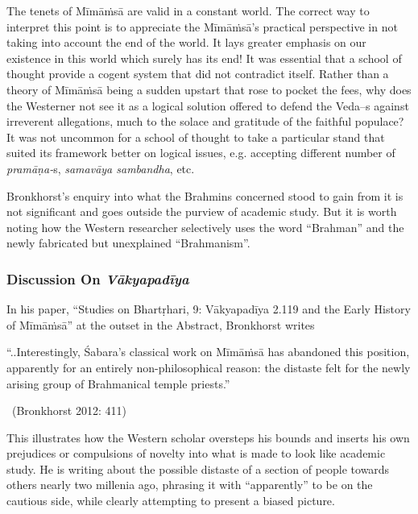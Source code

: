 The tenets of Mīmāṁsā are valid in a constant world. The correct way to interpret this point is to appreciate the Mīmāṁsā’s practical perspective in not taking into account the end of the world. It lays greater emphasis on our existence in this world which surely has its end! It was essential that a school of thought provide a cogent system that did not contradict itself. Rather than a theory of Mīmāṁsā being a sudden upstart that rose to pocket the fees, why does the Westerner not see it as a logical solution offered to defend the Veda--s against irreverent allegations, much to the solace and gratitude of the faithful populace? It was not uncommon for a school of thought to take a particular stand that suited its framework better on logical issues, e.g. accepting different number of \textit{pramāṇa-}s, \textit{samavāya sambandha}, etc.

Bronkhorst’s enquiry into what the Brahmins concerned stood to gain from it is not significant and goes outside the purview of academic study. But it is worth noting how the Western researcher selectively uses the word “Brahman” and the newly fabricated but unexplained “Brahmanism”.

\vspace{-.3cm}

\subsubsection*{Discussion On \textit{Vākyapadīya}}

In his paper, “Studies on Bhartṛhari, 9: Vākyapadīya 2.119 and the Early History of Mīmāṁsā” at the outset in the Abstract, Bronkhorst writes

\begin{myquote}
“..Interestingly, Śabara’s classical work on Mīmāṁsā has abandoned this position, apparently for an entirely non-philosophical reason: the distaste felt for the newly arising group of Brahmanical temple priests.” 

~\hfill (Bronkhorst 2012: 411)
\end{myquote}

This illustrates how the Western scholar oversteps his bounds and inserts his own prejudices or compulsions of novelty into what is made to look like academic study. He is writing about the possible distaste of a section of people towards others nearly two millenia ago, phrasing it with “apparently” to be on the cautious side, while clearly attempting to present a biased picture.

